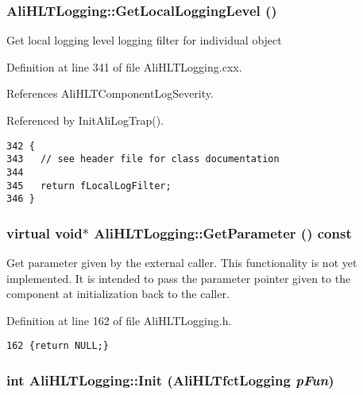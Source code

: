 \subsubsection{ Ali\-HLTLogging::Get\-Local\-Logging\-Level ()}\label{classAliHLTLogging_a11}


Get local logging level logging filter for individual object 

Definition at line 341 of file Ali\-HLTLogging.cxx.

References Ali\-HLTComponent\-Log\-Severity.

Referenced by Init\-Ali\-Log\-Trap().

\footnotesize\begin{verbatim}342 {
343   // see header file for class documentation
344 
345   return fLocalLogFilter;
346 }
\end{verbatim}\normalsize 


\subsubsection{\setlength{\rightskip}{0pt plus 5cm}virtual void$\ast$ Ali\-HLTLogging::Get\-Parameter () const\hspace{0.3cm}{\tt  [inline, virtual]}}\label{classAliHLTLogging_a12}


Get parameter given by the external caller. This functionality is not yet implemented. It is intended to pass the parameter pointer given to the component at initialization back to the caller. 

Definition at line 162 of file Ali\-HLTLogging.h.

\footnotesize\begin{verbatim}162 {return NULL;}
\end{verbatim}\normalsize 


\subsubsection{\setlength{\rightskip}{0pt plus 5cm}int Ali\-HLTLogging::Init ({\bf Ali\-HLTfct\-Logging} {\em p\-Fun})\hspace{0.3cm}{\tt  [static]}}\label{classAliHLTLogging_e0}


